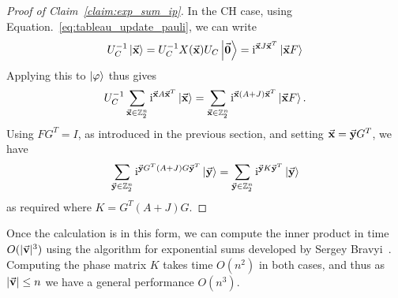 \begin{proof}[Proof of Claim~\ref{claim:exp_sum_ip}]
In the CH case, using Equation.~\ref{eq:tableau_update_pauli}, we can write
\[U_{C}^{-1}\ket{\va{x}}=U_{C}^{-1}X(\va{x})U_{C}\ket{\va{0}}=\mathrm{i}^{\va{x}J\va{x}^{T}}\ket{\va{x}F}\]
Applying this to $\ket{\varphi}$ thus gives
\[U_{C}^{-1}\sum_{\va{x}\in\mathbb{Z}_{2}^{n}}\mathrm{i}^{\va{x}A\va{x}^{T}}\ket{\va{x}}=\sum_{\va{x}\in\mathbb{Z}_{2}^{n}}\mathrm{i}^{\va{x}(A+J)\va{x}^{T}}\ket{\va{x}F}.\]
Using $FG^{T}=I$, as introduced in the previous section, and setting $\va{x}=\va{y}G^{T}$, we have
\[\sum_{\va{y}\in\mathbb{Z}_{2}^{n}}\mathrm{i}^{\va{y}G^{T}(A+J)G\va{y}^{T}}\ket{\va{y}}=\sum_{\va{y}\in\mathbb{Z}_{2}^{n}}\mathrm{i}^{\va{y}K\va{y}^{T}}\ket{\va{y}}\]
as required where $K=G^{T}(A+J)G$.
\end{proof}
Once the calculation is in this form, we can compute the inner product in time $O(\vert \va{v}\vert^{3})$ using the algorithm for exponential sums developed by Sergey Bravyi~\cite{Bravyi2018}. Computing the phase matrix $K$ takes time $O(n^{2})$ in both cases, and thus as $\vert \va{v}\vert\leq n$ we have a general performance $O(n^{3})$.
